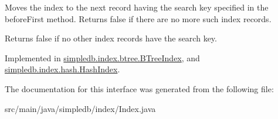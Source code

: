 Moves the index to the next record having the search key specified in the before\+First method. Returns false if there are no more such index records. \begin{DoxyReturn}{Returns}
false if no other index records have the search key. 
\end{DoxyReturn}


Implemented in \hyperlink{classsimpledb_1_1index_1_1btree_1_1BTreeIndex_aa2629b173455d96fde28353e150da4f0}{simpledb.\+index.\+btree.\+B\+Tree\+Index}, and \hyperlink{classsimpledb_1_1index_1_1hash_1_1HashIndex_a07532e9c86a7d28791f9bed10a27387f}{simpledb.\+index.\+hash.\+Hash\+Index}.



The documentation for this interface was generated from the following file\+:\begin{DoxyCompactItemize}
\item 
src/main/java/simpledb/index/Index.\+java\end{DoxyCompactItemize}
